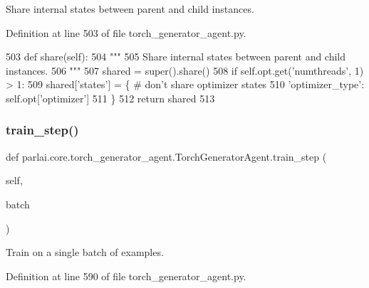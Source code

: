 \begin{DoxyVerb}Share internal states between parent and child instances.
\end{DoxyVerb}
 

Definition at line 503 of file torch\+\_\+generator\+\_\+agent.\+py.


\begin{DoxyCode}
503     \textcolor{keyword}{def }share(self):
504         \textcolor{stringliteral}{"""}
505 \textcolor{stringliteral}{        Share internal states between parent and child instances.}
506 \textcolor{stringliteral}{        """}
507         shared = super().share()
508         \textcolor{keywordflow}{if} self.opt.get(\textcolor{stringliteral}{'numthreads'}, 1) > 1:
509             shared[\textcolor{stringliteral}{'states'}] = \{  \textcolor{comment}{# don't share optimizer states}
510                 \textcolor{stringliteral}{'optimizer\_type'}: self.opt[\textcolor{stringliteral}{'optimizer'}]
511             \}
512         \textcolor{keywordflow}{return} shared
513 
\end{DoxyCode}
\mbox{\label{classparlai_1_1core_1_1torch__generator__agent_1_1TorchGeneratorAgent_afe2226ddfc838ec27580e3499cc0bae7}} 
\subsubsection{\texorpdfstring{train\+\_\+step()}{train\_step()}}
{\footnotesize\ttfamily def parlai.\+core.\+torch\+\_\+generator\+\_\+agent.\+Torch\+Generator\+Agent.\+train\+\_\+step (\begin{DoxyParamCaption}\item[{}]{self,  }\item[{}]{batch }\end{DoxyParamCaption})}

\begin{DoxyVerb}Train on a single batch of examples.
\end{DoxyVerb}
 

Definition at line 590 of file torch\+\_\+generator\+\_\+agent.\+py.


